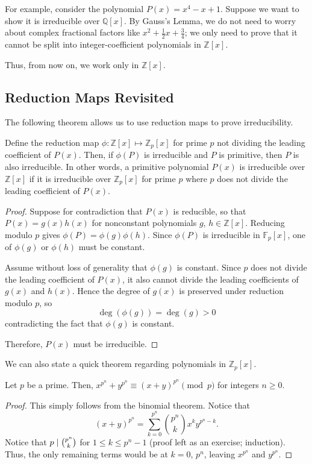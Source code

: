 \documentclass[11pt]{scrartcl}
\begin{document}
For example, consider the polynomial $P(x) = x^4 - x + 1$. Suppose we want to show it is irreducible over $\mathbb{Q}[x]$. By Gauss's Lemma, we do not need to worry about complex fractional factors like $x^2 + \frac{1}{2}x + \frac{3}{4}$; we only need to prove that it cannot be split into integer-coefficient polynomials in $\mathbb{Z}[x]$.

Thus, from now on, we work only in $\mathbb{Z}[x]$.

\subsection{Reduction Maps Revisited}

The following theorem allows us to use reduction maps to prove irreducibility.

\begin{theorem*}
Define the reduction map $\phi: \mathbb{Z}[x] \mapsto \mathbb{Z}_p[x]$ for prime $p$ not dividing the leading coefficient of $P(x)$. Then, if $\phi(P)$ is irreducible and $P$ is primitive, then $P$ is also irreducible. In other words, a primitive polynomial $P(x)$ is irreducible over $\mathbb{Z}[x]$ if it is irreducible over $\mathbb{Z}_p[x]$ for prime $p$ where $p$ does not divide the leading coefficient of $P(x)$.
\end{theorem*}
\begin{proof}
Suppose for contradiction that $P(x)$ is reducible, so that $P(x)=g(x)h(x)$ for nonconstant polynomials $g$, $h\in\mathbb{Z}[x]$. Reducing modulo $p$ gives $\phi(P)=\phi(g)\phi(h)$. Since $\phi(P)$ is irreducible in $\mathbb{F}_p[x]$, one of $\phi(g)$ or $\phi(h)$ must be constant.

Assume without loss of generality that $\phi(g)$ is constant. Since $p$ does not divide the leading coefficient of $P(x)$, it also cannot divide the leading coefficients of $g(x)$ and $h(x)$. Hence the degree of $g(x)$ is preserved under reduction modulo $p$, so \[\deg(\phi(g))=\deg(g)>0\] contradicting the fact that $\phi(g)$ is constant.

Therefore, $P(x)$ must be irreducible.
\end{proof}

We can also state a quick theorem regarding polynomials in $\mathbb{Z}_p[x]$.

\begin{lemma*}
Let $p$ be a prime. Then, $x^{p^n}+y^{p^n} \equiv (x+y)^{p^n} \pmod{p}$ for integers $n\ge 0$.
\end{lemma*}
\begin{proof}
This simply follows from the binomial theorem. Notice that \[(x+y)^{p^n} = \sum_{k=0}^{p^n} \binom{p^n}{k}x^ky^{p^n-k}.\] Notice that $p \mid \tbinom{p^n}{k}$ for $1 \le k \le p^n-1$ (proof left as an exercise; induction). Thus, the only remaining terms would be at $k = 0$, $p^n$, leaving $x^{p^n}$ and $y^{p^n}$.
\end{proof}
\end{document}
